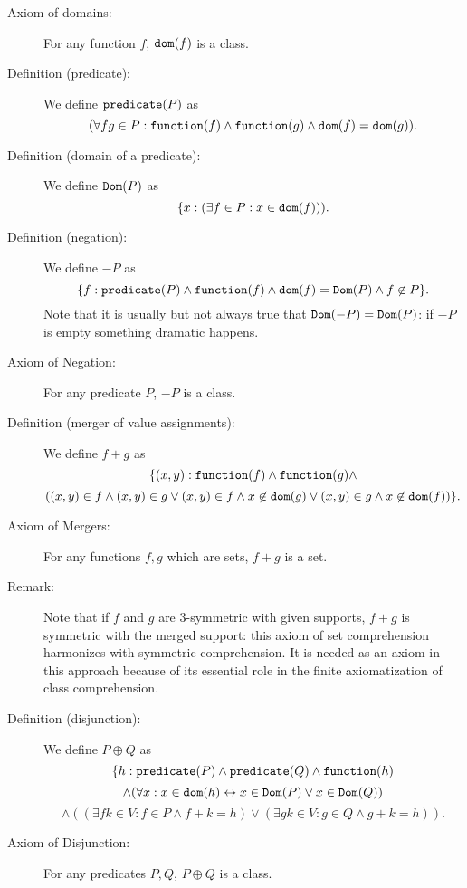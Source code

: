 \documentclass[12pt]{article}
\begin{document}
\begin{description}

\item[Axiom of domains:]  For any function $f$, ${\tt dom}(f)$ is a class.

\item[Definition (predicate):]  We define ${\tt predicate}(P)$ as $$(\forall fg\in P:{\tt function}(f) \wedge {\tt function}(g) \wedge {\tt dom}(f)={\tt dom}(g)).$$

\item[Definition (domain of a predicate):]  We define ${\tt Dom}(P)$ as $$\{x:(\exists f\in P:x \in {\tt dom}(f))).$$

\item[Definition (negation):]  We define $-P$ as $$\{f:{\tt predicate}(P) \wedge {\tt function}(f) \wedge {\tt dom}(f) = {\tt Dom}(P) \wedge f \not\in P\}.$$  Note that it is usually but not always true that ${\tt Dom}(-P) = {\tt Dom}(P)$:  if $-P$ is empty something dramatic happens.

\item[Axiom of Negation:]  For any predicate $P$, $-P$ is a class.

\item[Definition (merger of value assignments):]  We define $f+g$ as $$\{(x,y):{\tt function}(f) \wedge {\tt function}(g) \wedge$$ $$ ((x,y) \in f \wedge (x,y)\in g \vee (x,y) \in f \wedge x \not\in {\tt dom}(g) \vee (x,y) \in g \wedge x \not\in {\tt dom}(f))\}.$$

\item[Axiom of Mergers:]  For any functions $f,g$ which are sets, $f+g$ is a set.

\item[Remark:]  Note that if $f$ and $g$ are 3-symmetric with given supports, $f+g$ is symmetric with the merged support:  this axiom of set comprehension harmonizes with symmetric comprehension.  It is needed
as an axiom in this approach because of its essential role in the finite axiomatization of class comprehension.

\item[Definition (disjunction):]  We define $P \oplus Q$ as $$\{h:{\tt predicate}(P) \wedge {\tt predicate}(Q) \wedge {\tt function}(h) $$ $$ \wedge (\forall x:x \in {\tt dom}(h) \leftrightarrow x \in {\tt Dom}(P) \vee x \in {\tt Dom}(Q)) $$ $$\wedge ((\exists fk\in V:f \in P \wedge f+k=h) \vee (\exists gk\in V:g \in Q \wedge g+k=h)).$$

\item[Axiom of Disjunction:]  For any predicates $P,Q$, $P \oplus Q$ is a class.


\end{description}
\end{document}
